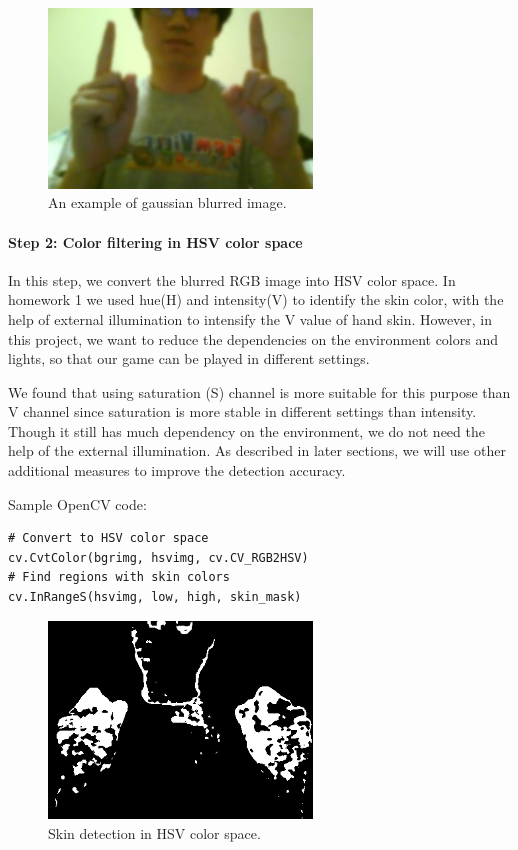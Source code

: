 \documentclass[10pt,twocolumn,letterpaper]{article}
\begin{document}
\begin{figure}[h]
\centering
\includegraphics[width=7cm]{gaussian.png}
\caption{An example of gaussian blurred image.}
\label{fig:gaussin}
\end{figure}

\paragraph{Step 2: Color filtering in HSV color space} In this step,  
we convert the blurred RGB image into HSV color space. In homework 1 we used 
hue(H) and intensity(V) to identify the skin color, with the help of external illumination 
to intensify the V value of hand skin. However, in this project, we want to reduce the 
dependencies on the environment colors and lights, so that our game can be played in different 
settings.

We found that using saturation (S) channel is more suitable for this purpose 
than V channel since saturation is more stable in different settings than intensity. 
Though it still has much dependency on the environment, we do not need the help of 
the external illumination. As described in later sections, we will use other 
additional measures to improve the detection accuracy. 

Sample OpenCV code:
\begin{verbatim}
# Convert to HSV color space
cv.CvtColor(bgrimg, hsvimg, cv.CV_RGB2HSV)
# Find regions with skin colors
cv.InRangeS(hsvimg, low, high, skin_mask)
\end{verbatim}

\begin{figure}[h]
\centering
\includegraphics[width=7cm]{hsv.png}
\caption{Skin detection in HSV color space.}
\label{fig:hsv}
\end{figure}
\end{document}
